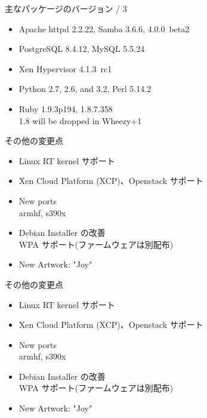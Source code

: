 \begin{frame}{主なパッケージのバージョン / 3}

\begin{itemize}
  \item Apache httpd 2.2.22, Samba 3.6.6, 4.0.0~beta2
  \item PostgreSQL 8.4.12, MySQL 5.5.24
  \item Xen Hypervisor 4.1.3~rc1
  \item Python 2.7, 2.6, and 3.2, Perl 5.14.2
  \item Ruby 1.9.3p194, 1.8.7.358 \\
        1.8 will be dropped in Wheezy+1
\end{itemize}

\end{frame}

\begin{frame}{その他の変更点}

\begin{itemize}
 \item Linux RT kernel サポート
 \item Xen Cloud Platform (XCP)、Openstack サポート 
 \item New ports\\
  armhf, s390x
 \item Debian Installer の改善 \\
  WPA サポート(ファームウェアは別配布)
 \item  New Artwork: "Joy"
\end{itemize}

\end{frame}

\begin{frame}{その他の変更点}

\begin{itemize}
 \item Linux RT kernel サポート
 \item Xen Cloud Platform (XCP)、Openstack サポート 
 \item New ports\\
  armhf, s390x
 \item Debian Installer の改善 \\
  WPA サポート(ファームウェアは別配布)
 \item  {\color{red}New Artwork: "Joy"}
\end{itemize}

\end{frame}


{
\begin{frame}[plain]

\begin{center}
\end{center}

\end{frame}
}

